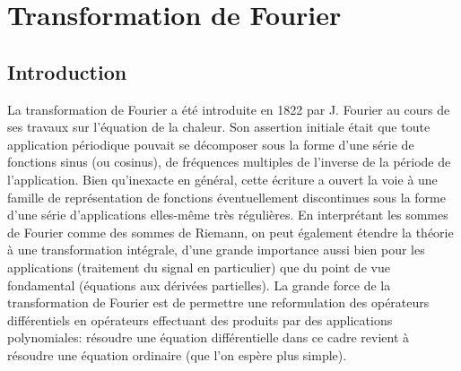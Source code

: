 \chapter{Transformation de Fourier}
\section{Introduction}
La transformation de Fourier a été introduite en 1822 par J. Fourier au
cours de ses travaux sur l'équation de la chaleur. Son assertion initiale était
que toute application périodique pouvait se décomposer sous la forme d'une série
de fonctions sinus (ou cosinus), de fréquences multiples de l'inverse de la
période de l'application. Bien qu'inexacte en général, cette écriture a ouvert
la voie à une famille de représentation de fonctions éventuellement discontinues
sous la forme d'une série d'applications elles-même très régulières. En
interprétant les sommes de Fourier comme des sommes de Riemann, on peut
également étendre la théorie à une transformation intégrale, d'une grande
importance aussi bien pour les applications (traitement du signal en
particulier) que du point de vue fondamental (équations aux dérivées
partielles). La grande force de la transformation de Fourier est de permettre
une reformulation des opérateurs différentiels en opérateurs effectuant des
produits par des applications polynomiales: résoudre une équation différentielle
dans ce cadre revient à résoudre une équation ordinaire (que l'on espère plus
simple). 
